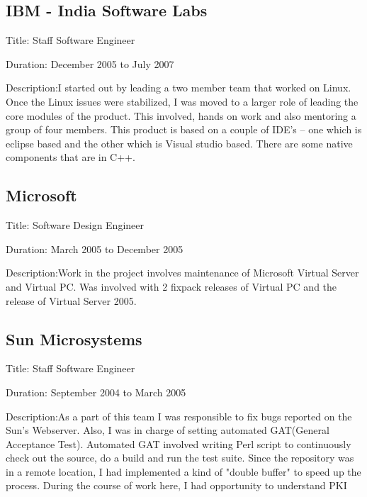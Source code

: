 \documentclass [a4paper,11pt] {article}
\begin{document}
\subsection*{IBM - India Software Labs}
\begin{description}
\item{Title:} Staff Software Engineer
\item{Duration:} December 2005 to July 2007
\item{Description:}I started out by leading a two member team that worked on Linux. Once the Linux issues were stabilized, I was moved to a larger role of leading the core modules of the product. This involved, hands on work and also mentoring a group of four members. This product is based on a couple of IDE’s – one which is eclipse based and the other which is Visual studio based. There are some native components that are in C++.
\end{description}


\subsection*{Microsoft}
\begin{description}
\item{Title:} Software Design Engineer
\item{Duration:} March 2005 to December 2005
\item{Description:}Work in the project involves maintenance of Microsoft Virtual Server and Virtual PC. Was involved with 2 fixpack releases of Virtual PC and the release of Virtual Server 2005.
\end{description}

\subsection*{Sun Microsystems}
\begin{description}
\item{Title:} Staff Software Engineer
\item{Duration:} September 2004 to March 2005
\item{Description:}As a part of this team I was responsible to fix bugs reported on the Sun's Webserver. Also, I was in charge of setting automated GAT(General Acceptance Test). Automated GAT involved writing Perl script to continuously check out the source, do a build and run the test suite. Since the repository was in a remote location, I had implemented a kind of "double buffer" to speed up the process.
During the course of work here, I had opportunity to understand PKI
\end{description}
\end{document}
